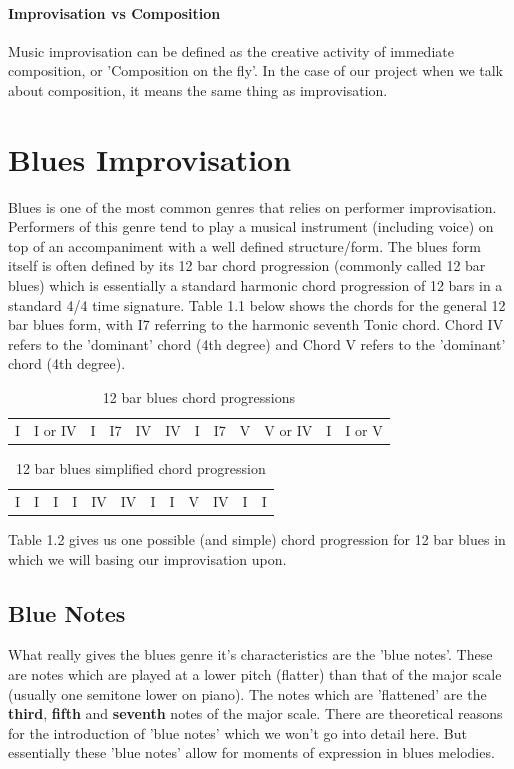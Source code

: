 \documentclass[pdftex,12pt,a4paper]{report}
\begin{document}
\paragraph{Improvisation vs Composition}
Music improvisation can be defined as the creative activity of immediate composition, or 'Composition on the fly'. In the case of our project when we talk about composition, it means the same thing as improvisation.


\section{Blues Improvisation}
Blues is one of the most common genres that relies on performer improvisation. Performers of this genre tend to play a musical instrument (including voice) on top of an accompaniment with a well defined structure/form. The blues form itself is often defined by its 12 bar chord progression (commonly called 12 bar blues) which is essentially a standard harmonic chord progression of 12 bars in a standard 4/4 time signature. Table 1.1 below shows the chords for the general 12 bar blues form, with I7 referring to the harmonic seventh Tonic chord. Chord IV refers to the 'dominant' chord (4th degree) and Chord V refers to the 'dominant' chord (4th degree).


\begin{table}[here]
\centering
{}
\begin{tabular}{|*{12}{C|}}
  I & I or IV & I & I7 & IV & IV & I & I7 & V & V or IV & I & I or V
\end{tabular}
\caption{12 bar blues chord progressions}
\label{12 bar blues}
\end{table}


\begin{table}[here]
\centering
{}
\begin{tabular}{|*{12}{C|}}
  I & I & I & I & IV & IV & I & I & V & IV & I & I
\end{tabular}
\caption{12 bar blues simplified chord progression}
\label{12 bar blues}
\end{table}


Table 1.2 gives us one possible (and simple) chord progression for 12 bar blues in which we will basing our improvisation upon. 


\subsection{Blue Notes} What really gives the blues genre it's characteristics are the 'blue notes'. These are notes which are played at a lower pitch (flatter) than that of the major scale (usually one semitone lower on piano). The notes which are 'flattened' are the \textbf{third}, \textbf{fifth} and \textbf{seventh} notes of the major scale.
There are theoretical reasons for the introduction of 'blue notes' which we won't go into detail here. But essentially these 'blue notes' allow for moments of expression in blues melodies. 
\end{document}
